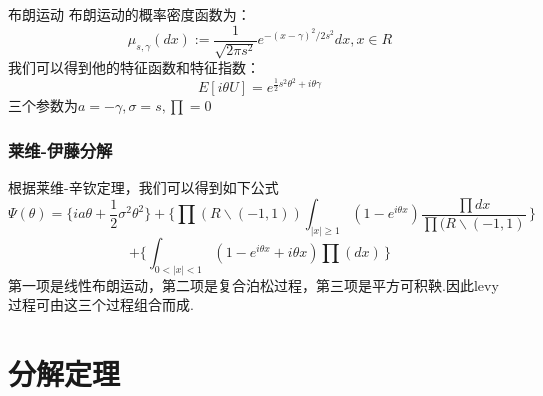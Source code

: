 \documentclass{beamer}
\begin{document}
\begin{frame}
布朗运动\newline\newline
布朗运动的概率密度函数为：\[\mu_{s,\gamma}(dx):=\frac{1}{\sqrt{2\pi s^{2}}}e^{-(x-\gamma)^{2}/2s^{2}}dx ,x \in R\]我们可以得到他的特征函数和特征指数：\[E[i\theta U]=e^{\frac{1}{2}s^{2}\theta^{2}+i\theta\gamma}\]三个参数为$a=-\gamma,\sigma=s,\prod=0$

\end{frame}

\begin{frame}
\frametitle{莱维-伊藤分解}


根据莱维-辛钦定理，我们可以得到如下公式\[\Psi(\theta)=\{ia\theta+\frac{1}{2}\sigma^{2}\theta^{2}\}+\{\prod(R\backslash(-1,1))\int_{|x|\geq1}(1-e^{i\theta x})\frac{\prod{dx}}{\prod(R\backslash(-1,1)} \,\}\]\newline\[+\{\int_{0<|x|<1}(1-e^{i\theta x}+i\theta x)\prod(dx) \,\} \]
第一项是线性布朗运动，第二项是复合泊松过程，第三项是平方可积鞅.因此levy过程可由这三个过程组合而成.

\end{frame}



\section{分解定理}\fontsize{10pt}{10pt}\selectfont

\end{document}
